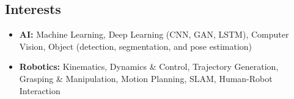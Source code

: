 \documentclass[10pt, oneside]{article} %
\begin{document}
\begin{paracol}{2}


\section{Interests}


\begin{itemize}[leftmargin=*, topsep=0pt, label={}]
	
	\item{\textbf{AI:} Machine Learning, Deep Learning (CNN, GAN, LSTM), Computer Vision, Object (detection, segmentation, and pose estimation)}%
	
	\item{\textbf{Robotics:} Kinematics, Dynamics \& Control, Trajectory Generation, Grasping \& Manipulation, Motion Planning, SLAM, Human-Robot Interaction} %


\end{itemize}
\end{paracol}
\end{document}
